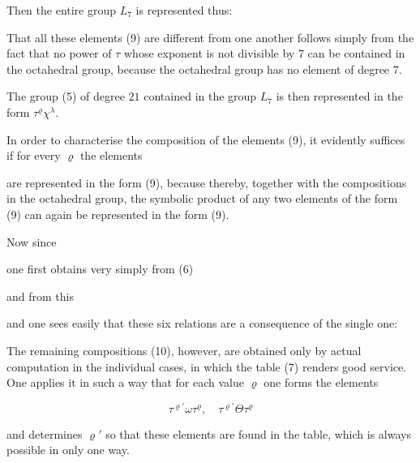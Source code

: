
Then the entire group $L_7$ is represented thus:


That all these elements (9) are different from one another follows simply from the fact that no power of $\tau$ whose exponent is not divisible by 7 can be contained in the octahedral group, because the octahedral group has no element of degree $7$.

The group (5) of degree $21$ contained in the group $L_7$ is then represented in the form $\tau^\varrho \chi^\lambda$.

In order to characterise the composition of the elements (9), it evidently suffices if for every $\varrho$ the elements


are represented in the form (9), because thereby, together with the compositions in the octahedral group, the symbolic product of any two elements of the form (9) can again be represented in the form (9).

Now since


one first obtains very simply from (6)


and from this


and one sees easily that these six relations are a consequence of the single one:


The remaining compositions (10), however, are obtained only by actual computation in the individual cases, in which the table (7) renders good service. One applies it in such a way that for each value $\varrho$ one forms the elements

\[
\tau^{\varrho'} \omega \tau^\varrho, \quad \tau^{\varrho'} \Theta \tau^\varrho
\]

and determines $\varrho'$ so that these elements are found in the table, which is always possible in only one way.
